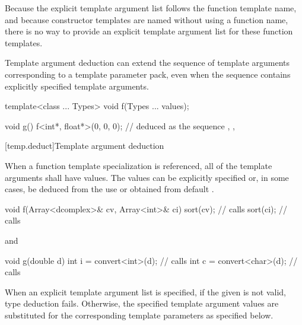 \pnum
\begin{note}
Because the explicit template argument list follows the function
template name, and because
constructor templates are named without using a
function name, there is no way to provide an explicit
template argument list for these function templates.
\end{note}

\pnum
Template argument deduction can extend the sequence of template
arguments corresponding to a template parameter pack, even when the
sequence contains explicitly specified template arguments.
\begin{example}
\begin{codeblock}
template<class ... Types> void f(Types ... values);

void g() {
  f<int*, float*>(0, 0, 0);     //  deduced as the sequence , , 
}
\end{codeblock}
\end{example}

[temp.deduct]{Template argument deduction}

\pnum
When a
function template
specialization is referenced, all of the
template arguments shall have values.
The values can be
explicitly specified or, in some cases, be deduced from the use
or obtained from default
.
\begin{example}
\begin{codeblock}
void f(Array<dcomplex>& cv, Array<int>& ci) {
  sort(cv);                     // calls 
  sort(ci);                     // calls 
}
\end{codeblock}
and
\begin{codeblock}
void g(double d) {
  int i = convert<int>(d);      // calls 
  int c = convert<char>(d);     // calls 
}
\end{codeblock}
\end{example}

\pnum
When an explicit template argument list is specified, if the
given  is not valid,
type deduction fails.
Otherwise, the specified template argument values are substituted for the
corresponding template parameters as specified below.

